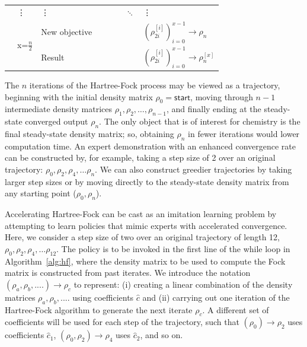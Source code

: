 \documentclass[twoside,11pt]{article}
\begin{document}
\begin{table}[htp!]
{\begin{tabular}{|l|l|l|l|l|l|l|l|}
	& \vdots      & \vdots      &                &                &                & $\ddots$ &   \vdots \\ \cline{2-8} 
	& \multirow{2}{*}{ x=$\frac{n}{2}$} & New objective         &                         &                          &                            &  & $(\rho_{2i}^{[i]})_{i=0}^{x-1} \rightarrow \rho_{n}$     \\ \cline{3-8} 
	&                & Result  &                &                &                &  & $(\rho_{2i}^{[i]})_{i=0}^{x-1}\rightarrow \rho_{n}^{[x]}$ \\ \hline
	\end{tabular}}
	\label{tab:DAgger}
	\end{table}


The $n$ iterations of the Hartree-Fock process may be viewed as a trajectory, beginning with the initial density matrix $\rho_0=\textsf{start}$, moving through $n-1$ intermediate density matrices $\rho_1,  \rho_2, \ldots, \rho_{n-1}$, and finally ending at the steady-state converged output $\rho_{n}$. The only object that is of interest for chemistry is the final steady-state density matrix; so, obtaining $\rho_n$ in fewer iterations would lower computation time.  An expert demonstration with an enhanced convergence rate can be constructed by, for example, taking a step size of 2 over an original trajectory: $\rho_0, \rho_2,  \rho_4, \ldots \rho_{n}$. We can also construct greedier trajectories by taking larger step sizes or by moving directly to the steady-state density matrix from any starting point ($\rho_0, \rho_{n}$). 

Accelerating Hartree-Fock can be cast as an imitation learning problem by attempting to learn policies that mimic experts with accelerated convergence. Here, we consider a step size of two over an original trajectory of length 12, $\rho_0, \rho_2,  \rho_4, \ldots \rho_{12}$.  The policy is to be invoked in the first line of the while loop in Algorithm~\ref{alg:hf}, where the density matrix to be used to compute the Fock matrix is constructed from past iterates. We introduce the notation $(\rho_a, \rho_b, ....) \rightarrow \rho_c $ to represent: (i) creating a linear combination of the density matrices $\rho_a, \rho_b, ....$ using coefficients $\hat{c}$ and (ii) carrying out one iteration of the Hartree-Fock algorithm to generate the next iterate $\rho_c$. A different set of coefficients will be used for each step of the trajectory, such that $(\rho_0) \rightarrow \rho_2 $ uses coefficients $\hat{c}_1$, $(\rho_0, \rho_2) \rightarrow \rho_4 $ uses $\hat{c}_2$, and so on. 
\end{document}
